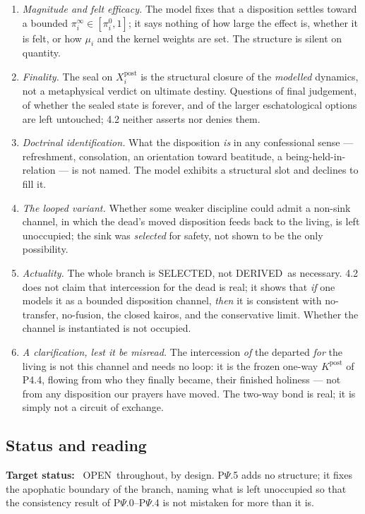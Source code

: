 \documentclass[11pt,a4paper]{article}
\newcommand{\stDerived}{\textcolor{cDer}{\textsf{\small DERIVED}}}
\newcommand{\stSelected}{\textcolor{cSel}{\textsf{\small SELECTED}}}
\newcommand{\stOpen}{\textcolor{cOpn}{\textsf{\small OPEN}}}
\theoremstyle{definition}
\theoremstyle{plain}
\theoremstyle{remark}
\begin{document}
\begin{enumerate}[label=\textup{(UO\arabic*)},leftmargin=1.4cm]
\item \emph{Magnitude and felt efficacy.} The model fixes that a disposition settles toward a
bounded \(\pi_i^{\infty}\in[\pi_i^{0},1]\); it says nothing of how large the effect is, whether
it is felt, or how \(\mu_i\) and the kernel weights are set. The structure is silent on
quantity.
\item \emph{Finality.} The seal on \(X_i^{\mathrm{post}}\) is the structural closure of the
\emph{modelled} dynamics, not a metaphysical verdict on ultimate destiny. Questions of final
judgement, of whether the sealed state is forever, and of the larger eschatological options are
left untouched; 4.2 neither asserts nor denies them.
\item \emph{Doctrinal identification.} What the disposition \emph{is} in any confessional
sense --- refreshment, consolation, an orientation toward beatitude, a being-held-in-relation
--- is not named. The model exhibits a structural slot and declines to fill it.
\item \emph{The looped variant.} Whether some weaker discipline could admit a non-sink channel,
in which the dead's moved disposition feeds back to the living, is left unoccupied; the sink was
\emph{selected} for safety, not shown to be the only possibility.
\item \emph{Actuality.} The whole branch is \stSelected, not \stDerived\ as necessary. 4.2 does
not claim that intercession for the dead is real; it shows that \emph{if} one models it as a
bounded disposition channel, \emph{then} it is consistent with no-transfer, no-fusion, the
closed kairos, and the conservative limit. Whether the channel is instantiated is not occupied.
\item \emph{A clarification, lest it be misread.} The intercession \emph{of} the departed
\emph{for} the living is not this channel and needs no loop: it is the frozen one-way
\(K^{\mathrm{post}}\) of P4.4, flowing from who they finally became, their finished holiness ---
not from any disposition our prayers have moved. The two-way bond is real; it is simply not a
circuit of exchange.
\end{enumerate}

\subsection{Status and reading}

\textbf{Target status:}~
\stOpen\ throughout, by design. P$\Psi$.5 adds no structure; it fixes the apophatic boundary of
the branch, naming what is left unoccupied so that the consistency result of P$\Psi$.0--P$\Psi$.4
is not mistaken for more than it is.
\end{document}
